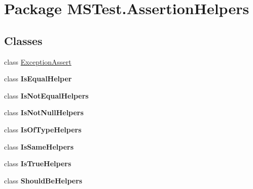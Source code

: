\hypertarget{namespace_m_s_test_1_1_assertion_helpers}{\section{Package M\-S\-Test.\-Assertion\-Helpers}
\label{namespace_m_s_test_1_1_assertion_helpers}
}
\subsection*{Classes}
\begin{DoxyCompactItemize}
\item 
class \hyperlink{class_m_s_test_1_1_assertion_helpers_1_1_exception_assert}{Exception\-Assert}
\item 
class {\bfseries Is\-Equal\-Helper}
\item 
class {\bfseries Is\-Not\-Equal\-Helpers}
\item 
class {\bfseries Is\-Not\-Null\-Helpers}
\item 
class {\bfseries Is\-Of\-Type\-Helpers}
\item 
class {\bfseries Is\-Same\-Helpers}
\item 
class {\bfseries Is\-True\-Helpers}
\item 
class {\bfseries Should\-Be\-Helpers}
\end{DoxyCompactItemize}
